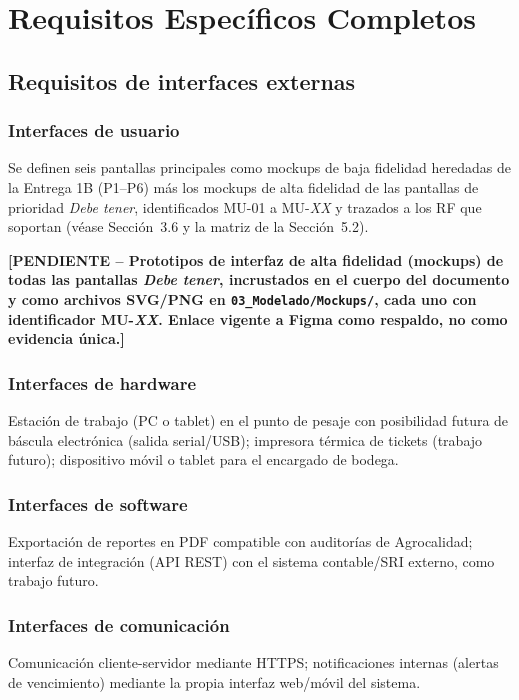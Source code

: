 \documentclass[11pt,a4paper]{article}
\newcommand{\PENDIENTE}[1]{\textcolor{pendiente}{\textbf{[PENDIENTE -- #1]}}}
\begin{document}
\section{Requisitos Específicos Completos}
\subsection{Requisitos de interfaces externas}
\subsubsection{Interfaces de usuario}
Se definen seis pantallas principales como mockups de baja fidelidad heredadas de la Entrega 1B (P1--P6) más los mockups de alta fidelidad de las pantallas de prioridad \textit{Debe tener}, identificados MU-01 a MU-\textit{XX} y trazados a los RF que soportan (véase Sección~3.6 y la matriz de la Sección~5.2).

\PENDIENTE{Prototipos de interfaz de alta fidelidad (mockups) de todas las pantallas \textit{Debe tener}, incrustados en el cuerpo del documento y como archivos SVG/PNG en \texttt{03\_Modelado/Mockups/}, cada uno con identificador MU-\textit{XX}. Enlace vigente a Figma como respaldo, no como evidencia única.}

\subsubsection{Interfaces de hardware}
Estación de trabajo (PC o tablet) en el punto de pesaje con posibilidad futura de báscula electrónica (salida serial/USB); impresora térmica de tickets (trabajo futuro); dispositivo móvil o tablet para el encargado de bodega.

\subsubsection{Interfaces de software}
Exportación de reportes en PDF compatible con auditorías de Agrocalidad; interfaz de integración (API REST) con el sistema contable/SRI externo, como trabajo futuro.

\subsubsection{Interfaces de comunicación}
Comunicación cliente-servidor mediante HTTPS; notificaciones internas (alertas de vencimiento) mediante la propia interfaz web/móvil del sistema.
\end{document}
